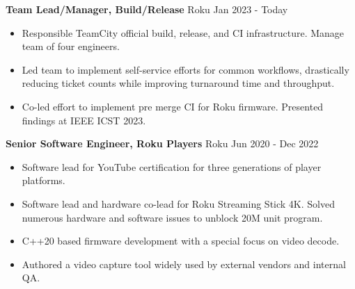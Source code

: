 \textbf{Team Lead/Manager, Build/Release} Roku \hfill Jan 2023 - Today

\begin{itemize} \itemsep -2pt
\item Responsible TeamCity official build, release, and CI infrastructure. Manage team of four engineers.
\item Led team to implement self-service efforts for common workflows, drastically reducing ticket counts while improving turnaround time and throughput.
\item Co-led effort to implement pre merge CI for Roku firmware. Presented findings at IEEE ICST 2023.
\end{itemize}

\textbf{Senior Software Engineer, Roku Players} Roku \hfill Jun 2020 - Dec 2022
\begin{itemize} \itemsep -2pt
\item Software lead for YouTube certification for three generations of player platforms.
\item Software lead and hardware co-lead for Roku Streaming Stick 4K. Solved numerous hardware and software issues to unblock 20M unit program.
\item C++20 based firmware development with a special focus on video decode.
\item Authored a video capture tool widely used by external vendors and internal QA.
\end{itemize}
